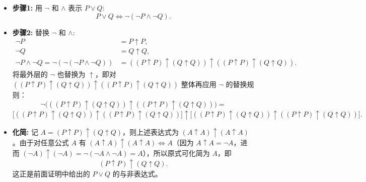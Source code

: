 \begin{itemize}
    \item \textbf{步骤1:} 用 $\neg$ 和 $\land$ 表示 $P \lor Q$:
    \[
    P \lor Q \Leftrightarrow \neg(\neg P \land \neg Q).
    \]
    \item \textbf{步骤2:} 替换 $\neg$ 和 $\land$:
    \begin{align*}
        \neg P &=P \uparrow P, \\
        \neg Q &= Q \uparrow Q, \\
        \neg P \land \neg Q =\neg(\neg(\neg P \land \neg Q))&=((P \uparrow P) \uparrow (Q \uparrow Q)) \uparrow ((P \uparrow P) \uparrow (Q \uparrow Q)).
    \end{align*}
    将最外层的 $\neg$ 也替换为 $\uparrow$，即对 $((P \uparrow P) \uparrow (Q \uparrow Q)) \uparrow ((P \uparrow P) \uparrow (Q \uparrow Q))$ 整体再应用 $\neg$ 的替换规则：
    \[
    \neg\Big(((P \uparrow P) \uparrow (Q \uparrow Q)) \uparrow ((P \uparrow P) \uparrow (Q \uparrow Q))\Big) =\]
    \[\Big[((P \uparrow P) \uparrow (Q \uparrow Q)) \uparrow ((P \uparrow P) \uparrow (Q \uparrow Q))\Big] \uparrow \Big[((P \uparrow P) \uparrow (Q \uparrow Q)) \uparrow ((P \uparrow P) \uparrow (Q \uparrow Q))\Big].
    \]
    \item \textbf{化简:} 记 $A = (P \uparrow P) \uparrow (Q \uparrow Q)$，则上述表达式为 $(A \uparrow A) \uparrow (A \uparrow A)$。由于对任意公式 $A$ 有 $(A \uparrow A) \uparrow (A \uparrow A) \Leftrightarrow A$（因为 $A \uparrow A = \neg A$，进而 $(\neg A) \uparrow (\neg A) = \neg(\neg A \land \neg A) = A$），所以原式可化简为 $A$，即
    \[
    (P \uparrow P) \uparrow (Q \uparrow Q).
    \]
    这正是前面证明中给出的 $P \lor Q$ 的与非表达式。
\end{itemize}
